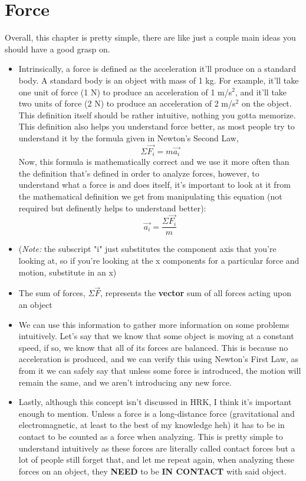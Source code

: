 \documentclass[openany]{book}
\begin{document}
\section{Force}
\quad Overall, this chapter is pretty simple, there are like just a couple main ideas you should have a good grasp on.
\begin{itemize}
    \item Intrinsically, a force is defined as the acceleration it'll produce on a standard body. A standard body is an object with mass of 1 kg. For example, it'll take one unit of force (1 N) to produce an acceleration of 1 m/s$^{2}$, and it'll take two units of force (2 N) to produce an acceleration of 2 m/s$^{2}$ on the object. This definition itself should be rather intuitive, nothing you gotta memorize. This definition also helps you understand force better, as most people try to understand it by the formula given in Newton's Second Law, \[\Sigma\vec{F_i} = m\vec{a_i}\] Now, this formula is mathematically correct and we use it more often than the definition that's defined in order to analyze forces, however, to understand what a force is and does itself, it's important to look at it from the mathematical definition we get from manipulating this equation (not required but definently helps to understand better): \[\vec{a_i} = \frac{\Sigma\vec{F_i}}{m}\]
    \item ({\textit{Note:}} the subscript "i" just substitutes the component axis that you're looking at, so if you're looking at the x components for a particular force and motion, substitute in an x)
    \item The sum of forces, $\Sigma\vec{F}$, represents the {\bfseries{vector}} sum of all forces acting upon an object
    \item We can use this information to gather more information on some problems intuitively. Let's say that we know that some object is moving at a constant speed, if so, we know that all of its forces are balanced. This is because no acceleration is produced, and we can verify this using Newton's First Law, as from it we can safely say that unless some force is introduced, the motion will remain the same, and we aren't introducing any new force.
    \item Lastly, although this concept isn't discussed in HRK, I think it's important enough to mention. Unless a force is a long-distance force (gravitational and electromagnetic, at least to the best of my knowledge heh) it has to be in contact to be counted as a force when analyzing. This is pretty simple to understand intuitively as these forces are literally called contact forces but a lot of people still forget that, and let me repeat again, when analyzing these forces on an object, they {\bfseries{NEED}} to be {\bfseries{IN CONTACT}} with said object.
\end{itemize}
\end{document}
